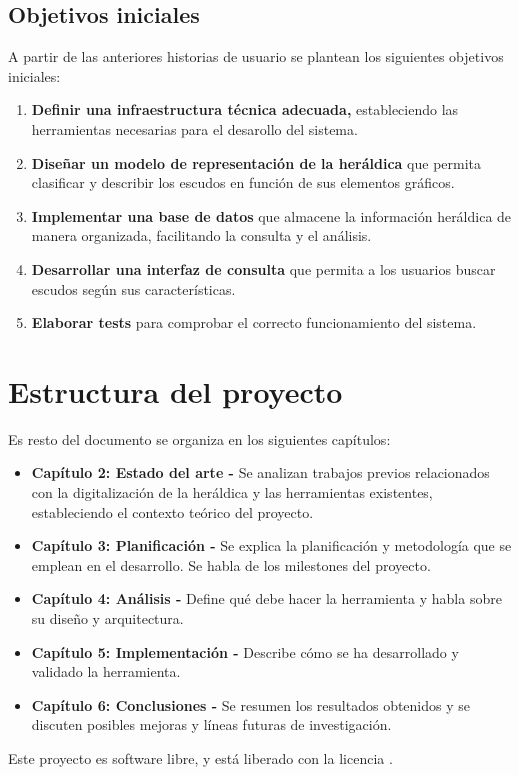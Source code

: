 \subsection{Objetivos iniciales}
A partir de las anteriores historias de usuario se plantean los siguientes objetivos
iniciales:

\begin{enumerate}
    \item \textbf{Definir una infraestructura técnica adecuada,} estableciendo las herramientas
    necesarias para el desarollo del sistema.
    \item \textbf{Diseñar un modelo de representación de la heráldica} que permita clasificar y 
    describir los escudos en función de sus elementos gráficos.
    \item \textbf{Implementar una base de datos} que almacene la información heráldica de manera
    organizada, facilitando la consulta y el análisis.
    \item \textbf{Desarrollar una interfaz de consulta} que permita a los usuarios buscar escudos
    según sus características.
    \item \textbf{Elaborar tests} para comprobar el correcto funcionamiento del sistema.
\end{enumerate}

\section{Estructura del proyecto}
Es resto del documento se organiza en los siguientes capítulos:

\begin{itemize}
    \item \textbf{Capítulo 2: Estado del arte -} Se analizan trabajos previos relacionados
    con la digitalización de la heráldica y las herramientas existentes, estableciendo
    el contexto teórico del proyecto.
    \item \textbf{Capítulo 3: Planificación - } Se explica la planificación y metodología
    que se emplean en el desarrollo. Se habla de los milestones del proyecto.
    \item \textbf{Capítulo 4: Análisis - } Define qué debe hacer la herramienta y habla
    sobre su diseño y arquitectura.
    \item \textbf{Capítulo 5: Implementación - }Describe cómo se ha desarrollado y validado
    la herramienta. 
    \item \textbf{Capítulo 6: Conclusiones - } Se resumen los resultados obtenidos y se
    discuten posibles mejoras y líneas futuras de investigación.
\end{itemize}

Este proyecto es software libre, y está liberado con la licencia \cite{gplv3}.